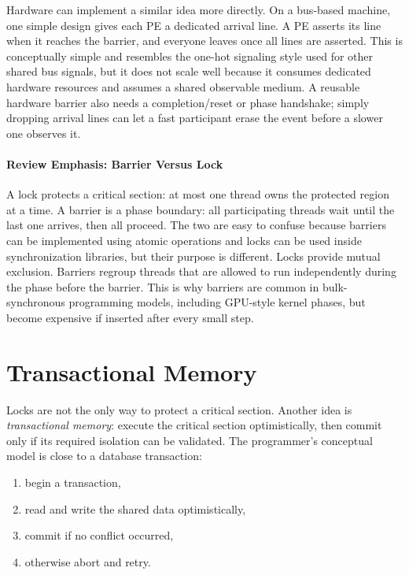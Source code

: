 Hardware can implement a similar idea more directly.
On a bus-based machine, one simple design gives each PE a dedicated arrival line.
A PE asserts its line when it reaches the barrier, and everyone leaves once all lines are asserted.
This is conceptually simple and resembles the one-hot signaling style used for other shared bus signals, but it does not scale well because it consumes dedicated hardware resources and assumes a shared observable medium.
A reusable hardware barrier also needs a completion/reset or phase handshake; simply dropping arrival lines can let a fast participant erase the event before a slower one observes it.

\paragraph{Review Emphasis: Barrier Versus Lock}\label{par:ch9-review-barrier-lock}
A lock protects a critical section: at most one thread owns the protected region at a time.
A barrier is a phase boundary: all participating threads wait until the last one arrives, then all proceed.
The two are easy to confuse because barriers can be implemented using atomic operations and locks can be used inside synchronization libraries, but their purpose is different.
Locks provide mutual exclusion.
Barriers regroup threads that are allowed to run independently during the phase before the barrier.
This is why barriers are common in bulk-synchronous programming models, including GPU-style kernel phases, but become expensive if inserted after every small step.


\section{Transactional Memory}\label{sec:sync-transactional-memory}
Locks are not the only way to protect a critical section.
Another idea is \textit{transactional memory}: execute the critical section optimistically, then commit only if its required isolation can be validated.
The programmer's conceptual model is close to a database transaction:
\begin{enumerate}
    \item begin a transaction,
    \item read and write the shared data optimistically,
    \item commit if no conflict occurred,
    \item otherwise abort and retry.
\end{enumerate}

